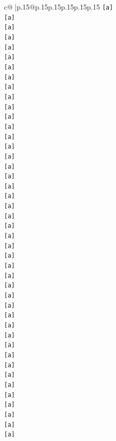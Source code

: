 \documentclass{article}
\begin{document}
{\begin{supertabular}{c@{$\;$}|p{.15\linewidth}@{}p{.15\linewidth}p{.15\linewidth}p{.15\linewidth}p{.15\linewidth}p{.15\linewidth}}
{{{\texttt{{[}a{]}} \\
\texttt{{[}a{]}} \\
\texttt{{[}a{]}} \\
\texttt{{[}a{]}} \\
\texttt{{[}a{]}} \\
\texttt{{[}a{]}} \\
\texttt{{[}a{]}} \\
\texttt{{[}a{]}} \\
\texttt{{[}a{]}} \\
\texttt{{[}a{]}} \\
\texttt{{[}a{]}} \\
\texttt{{[}a{]}} \\
\texttt{{[}a{]}} \\
\texttt{{[}a{]}} \\
\texttt{{[}a{]}} \\
\texttt{{[}a{]}} \\
\texttt{{[}a{]}} \\
\texttt{{[}a{]}} \\
\texttt{{[}a{]}} \\
\texttt{{[}a{]}} \\
\texttt{{[}a{]}} \\
\texttt{{[}a{]}} \\
\texttt{{[}a{]}} \\
\texttt{{[}a{]}} \\
\texttt{{[}a{]}} \\
\texttt{{[}a{]}} \\
\texttt{{[}a{]}} \\
\texttt{{[}a{]}} \\
\texttt{{[}a{]}} \\
\texttt{{[}a{]}} \\
\texttt{{[}a{]}} \\
\texttt{{[}a{]}} \\
\texttt{{[}a{]}} \\
\texttt{{[}a{]}} \\
\texttt{{[}a{]}} \\
\texttt{{[}a{]}} \\
\texttt{{[}a{]}} \\
\texttt{{[}a{]}} \\
\texttt{{[}a{]}} \\
\texttt{{[}a{]}} \\
\texttt{{[}a{]}} \\
\texttt{{[}a{]}} \\
\texttt{{[}a{]}} \\
\texttt{{[}a{]}} \\
}}}
\end{supertabular}}
\end{document}
